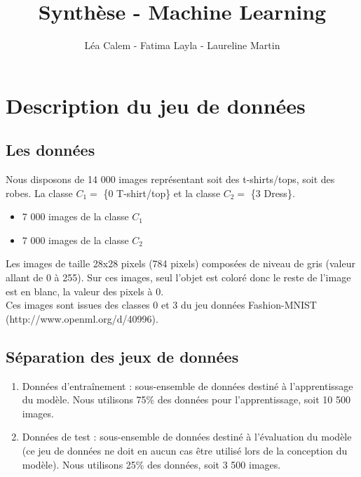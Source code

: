 \documentclass[a4paper,11pt]{article}
\title{Synthèse - Machine Learning}
\author{Léa Calem - Fatima Layla - Laureline Martin}
\begin{document}
\maketitle
	
\section{Description du jeu de données}
	\subsection{Les données}
		Nous disposons de 14 000 images représentant soit des t-shirts/tops, soit des robes. La classe $C_1 =$ \{0 T-shirt/top\} et la classe $C_2 =$ \{3 Dress\}.
		\begin{itemize}
			\item 7 000 images de la classe $C_1$
			\item 7 000 images de la classe $C_2$
		\end{itemize}
		Les images de taille 28x28 pixels (784 pixels) composées de niveau de gris (valeur allant de 0 à 255). Sur ces images, seul l’objet est coloré donc le reste de l’image est en blanc, la valeur des pixels à 0.\\
		Ces images sont issues des classes 0 et 3 du jeu données Fashion-MNIST (http://www.openml.org/d/40996). 
	\subsection{Séparation des jeux de données}
		\begin{enumerate}
			\item Données d’entraînement : sous-ensemble de données destiné à l’apprentissage du modèle. Nous utilisons 75\% des données pour l'apprentissage, soit 10 500 images.
			\item Données de test : sous-ensemble de données destiné à l’évaluation du modèle (ce jeu de données ne doit en aucun cas être utilisé lors de la conception du modèle). Nous utilisons 25\% des données, soit 3 500 images.
		\end{enumerate}
\end{document}

